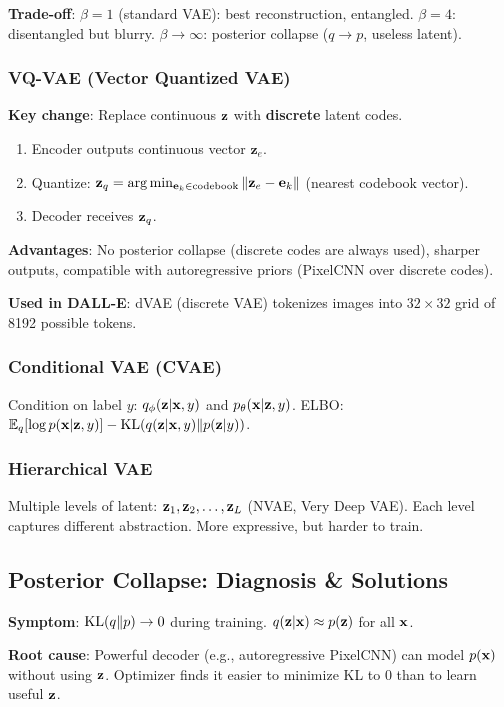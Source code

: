 \textbf{Trade-off}: $\beta = 1$ (standard VAE): best reconstruction, entangled. $\beta = 4$: disentangled but blurry. $\beta \to \infty$: posterior collapse ($q \to p$, useless latent).

\subsubsection{VQ-VAE (Vector Quantized VAE)}
\textbf{Key change}: Replace continuous $\mathbf{z}$ with \textbf{discrete} latent codes.
\begin{enumerate}
\item Encoder outputs continuous vector $\mathbf{z}_e$.
\item Quantize: $\mathbf{z}_q = \arg\min_{\mathbf{e}_k \in \text{codebook}} \|\mathbf{z}_e - \mathbf{e}_k\|$ (nearest codebook vector).
\item Decoder receives $\mathbf{z}_q$.
\end{enumerate}
\textbf{Advantages}: No posterior collapse (discrete codes are always used), sharper outputs, compatible with autoregressive priors (PixelCNN over discrete codes).

\textbf{Used in DALL-E}: dVAE (discrete VAE) tokenizes images into $32{\times}32$ grid of 8192 possible tokens.

\subsubsection{Conditional VAE (CVAE)}
Condition on label $y$: $q_\phi(\mathbf{z}|\mathbf{x},y)$ and $p_\theta(\mathbf{x}|\mathbf{z},y)$.
ELBO: $\mathbb{E}_q[\log p(\mathbf{x}|\mathbf{z},y)] - \text{KL}(q(\mathbf{z}|\mathbf{x},y)\|p(\mathbf{z}|y))$.

\subsubsection{Hierarchical VAE}
Multiple levels of latent: $\mathbf{z}_1, \mathbf{z}_2, \ldots, \mathbf{z}_L$ (NVAE, Very Deep VAE). Each level captures different abstraction. More expressive, but harder to train.

\subsection{Posterior Collapse: Diagnosis \& Solutions}
\textbf{Symptom}: $\text{KL}(q\|p) \to 0$ during training. $q(\mathbf{z}|\mathbf{x}) \approx p(\mathbf{z})$ for all $\mathbf{x}$.

\textbf{Root cause}: Powerful decoder (e.g., autoregressive PixelCNN) can model $p(\mathbf{x})$ without using $\mathbf{z}$. Optimizer finds it easier to minimize KL to 0 than to learn useful $\mathbf{z}$.

